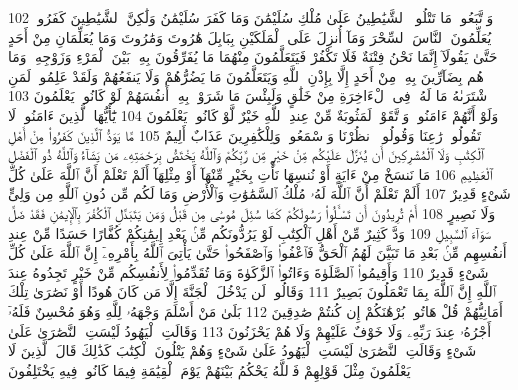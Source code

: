 {\tiny\colorbox{cl_aya}{102}} وَٱتَّبَعُوا۟ مَا تَتْلُوا۟ ٱلشَّيَٰطِينُ عَلَىٰ مُلْكِ سُلَيْمَٰنَ وَمَا كَفَرَ سُلَيْمَٰنُ وَلَٰكِنَّ ٱلشَّيَٰطِينَ كَفَرُوا۟ يُعَلِّمُونَ ٱلنَّاسَ ٱلسِّحْرَ وَمَآ أُنزِلَ عَلَى ٱلْمَلَكَيْنِ بِبَابِلَ هَٰرُوتَ وَمَٰرُوتَ وَمَا يُعَلِّمَانِ مِنْ أَحَدٍ حَتَّىٰ يَقُولَآ إِنَّمَا نَحْنُ فِتْنَةٌ فَلَا تَكْفُرْ فَيَتَعَلَّمُونَ مِنْهُمَا مَا يُفَرِّقُونَ بِهِۦ بَيْنَ ٱلْمَرْءِ وَزَوْجِهِۦ وَمَا هُم بِضَآرِّينَ بِهِۦ مِنْ أَحَدٍ إِلَّا بِإِذْنِ ٱللَّهِ وَيَتَعَلَّمُونَ مَا يَضُرُّهُمْ وَلَا يَنفَعُهُمْ وَلَقَدْ عَلِمُوا۟ لَمَنِ ٱشْتَرَىٰهُ مَا لَهُۥ فِى ٱلْءَاخِرَةِ مِنْ خَلَٰقٍ وَلَبِئْسَ مَا شَرَوْا۟ بِهِۦٓ أَنفُسَهُمْ لَوْ كَانُوا۟ يَعْلَمُونَ
{\tiny\colorbox{cl_aya}{103}} وَلَوْ أَنَّهُمْ ءَامَنُوا۟ وَٱتَّقَوْا۟ لَمَثُوبَةٌ مِّنْ عِندِ ٱللَّهِ خَيْرٌ لَّوْ كَانُوا۟ يَعْلَمُونَ
{\tiny\colorbox{cl_aya}{104}} يَٰٓأَيُّهَا ٱلَّذِينَ ءَامَنُوا۟ لَا تَقُولُوا۟ رَٰعِنَا وَقُولُوا۟ ٱنظُرْنَا وَٱسْمَعُوا۟ وَلِلْكَٰفِرِينَ عَذَابٌ أَلِيمٌ
{\tiny\colorbox{cl_aya}{105}} مَّا يَوَدُّ ٱلَّذِينَ كَفَرُوا۟ مِنْ أَهْلِ ٱلْكِتَٰبِ وَلَا ٱلْمُشْرِكِينَ أَن يُنَزَّلَ عَلَيْكُم مِّنْ خَيْرٍ مِّن رَّبِّكُمْ وَٱللَّهُ يَخْتَصُّ بِرَحْمَتِهِۦ مَن يَشَآءُ وَٱللَّهُ ذُو ٱلْفَضْلِ ٱلْعَظِيمِ
{\tiny\colorbox{cl_aya}{106}} مَا نَنسَخْ مِنْ ءَايَةٍ أَوْ نُنسِهَا نَأْتِ بِخَيْرٍ مِّنْهَآ أَوْ مِثْلِهَآ أَلَمْ تَعْلَمْ أَنَّ ٱللَّهَ عَلَىٰ كُلِّ شَىْءٍ قَدِيرٌ
{\tiny\colorbox{cl_aya}{107}} أَلَمْ تَعْلَمْ أَنَّ ٱللَّهَ لَهُۥ مُلْكُ ٱلسَّمَٰوَٰتِ وَٱلْأَرْضِ وَمَا لَكُم مِّن دُونِ ٱللَّهِ مِن وَلِىٍّ وَلَا نَصِيرٍ
{\tiny\colorbox{cl_aya}{108}} أَمْ تُرِيدُونَ أَن تَسْـَٔلُوا۟ رَسُولَكُمْ كَمَا سُئِلَ مُوسَىٰ مِن قَبْلُ وَمَن يَتَبَدَّلِ ٱلْكُفْرَ بِٱلْإِيمَٰنِ فَقَدْ ضَلَّ سَوَآءَ ٱلسَّبِيلِ
{\tiny\colorbox{cl_aya}{109}} وَدَّ كَثِيرٌ مِّنْ أَهْلِ ٱلْكِتَٰبِ لَوْ يَرُدُّونَكُم مِّنۢ بَعْدِ إِيمَٰنِكُمْ كُفَّارًا حَسَدًا مِّنْ عِندِ أَنفُسِهِم مِّنۢ بَعْدِ مَا تَبَيَّنَ لَهُمُ ٱلْحَقُّ فَٱعْفُوا۟ وَٱصْفَحُوا۟ حَتَّىٰ يَأْتِىَ ٱللَّهُ بِأَمْرِهِۦٓ إِنَّ ٱللَّهَ عَلَىٰ كُلِّ شَىْءٍ قَدِيرٌ
{\tiny\colorbox{cl_aya}{110}} وَأَقِيمُوا۟ ٱلصَّلَوٰةَ وَءَاتُوا۟ ٱلزَّكَوٰةَ وَمَا تُقَدِّمُوا۟ لِأَنفُسِكُم مِّنْ خَيْرٍ تَجِدُوهُ عِندَ ٱللَّهِ إِنَّ ٱللَّهَ بِمَا تَعْمَلُونَ بَصِيرٌ
{\tiny\colorbox{cl_aya}{111}} وَقَالُوا۟ لَن يَدْخُلَ ٱلْجَنَّةَ إِلَّا مَن كَانَ هُودًا أَوْ نَصَٰرَىٰ تِلْكَ أَمَانِيُّهُمْ قُلْ هَاتُوا۟ بُرْهَٰنَكُمْ إِن كُنتُمْ صَٰدِقِينَ
{\tiny\colorbox{cl_aya}{112}} بَلَىٰ مَنْ أَسْلَمَ وَجْهَهُۥ لِلَّهِ وَهُوَ مُحْسِنٌ فَلَهُۥٓ أَجْرُهُۥ عِندَ رَبِّهِۦ وَلَا خَوْفٌ عَلَيْهِمْ وَلَا هُمْ يَحْزَنُونَ
{\tiny\colorbox{cl_aya}{113}} وَقَالَتِ ٱلْيَهُودُ لَيْسَتِ ٱلنَّصَٰرَىٰ عَلَىٰ شَىْءٍ وَقَالَتِ ٱلنَّصَٰرَىٰ لَيْسَتِ ٱلْيَهُودُ عَلَىٰ شَىْءٍ وَهُمْ يَتْلُونَ ٱلْكِتَٰبَ كَذَٰلِكَ قَالَ ٱلَّذِينَ لَا يَعْلَمُونَ مِثْلَ قَوْلِهِمْ فَٱللَّهُ يَحْكُمُ بَيْنَهُمْ يَوْمَ ٱلْقِيَٰمَةِ فِيمَا كَانُوا۟ فِيهِ يَخْتَلِفُونَ
